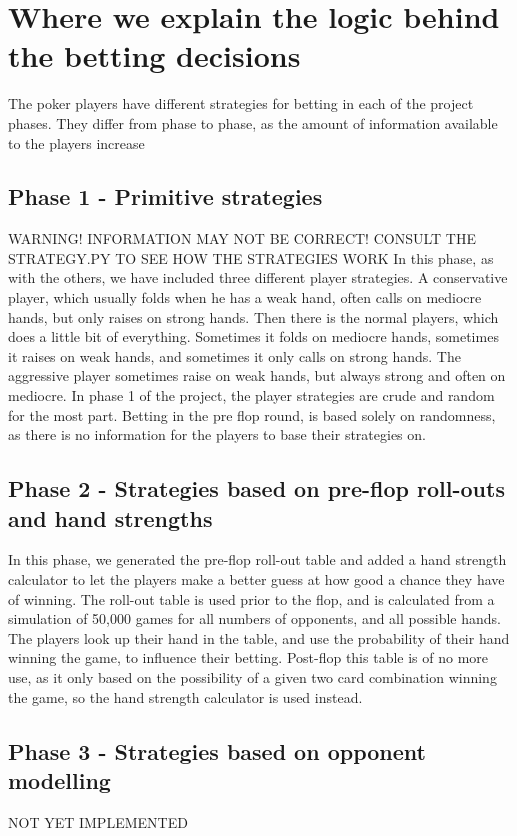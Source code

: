 \documentclass[titlepage]{article}
\begin{document}
\section{Where we explain the logic behind the betting decisions}
	The poker players have different strategies for betting in each of the project phases. They differ from phase to phase, as the amount of information available to the players increase
	
	\subsection{Phase 1 - Primitive strategies}
		WARNING! INFORMATION MAY NOT BE CORRECT! CONSULT THE STRATEGY.PY TO SEE HOW THE 	STRATEGIES WORK
In this phase, as with the others, we have included three different player strategies. A 		conservative player, which usually folds when he has a weak hand, often calls on mediocre hands, 	but only raises on strong hands. Then there is the normal players, which does a little bit of 		everything. Sometimes it folds on mediocre hands, sometimes it raises on weak hands, and 		sometimes it only calls on strong hands. The aggressive player sometimes raise on weak hands, but always strong and often on mediocre. In phase 1 of the project, the player strategies are crude and random for the most part. Betting 	in the pre flop round, is based solely on randomness, as there is no information for the players to base their strategies on. 
	
	\subsection{Phase 2 - Strategies based on pre-flop roll-outs and hand strengths}
		In this phase, we generated the pre-flop roll-out table and added a hand strength calculator to let the players make a better guess at how good a chance they have of winning. The roll-out table is used prior to the flop, and is calculated from a simulation of 50,000 games for all numbers of opponents, and all possible hands. The players look up their hand in the table, and use the probability of their hand winning the game, to influence their betting. Post-flop this table is of no more use, as it only based on the possibility of a given two card combination winning the game, so the hand strength calculator is used instead. 
		
	\subsection{Phase 3 - Strategies based on opponent modelling}
		NOT YET IMPLEMENTED
		
\end{document}
